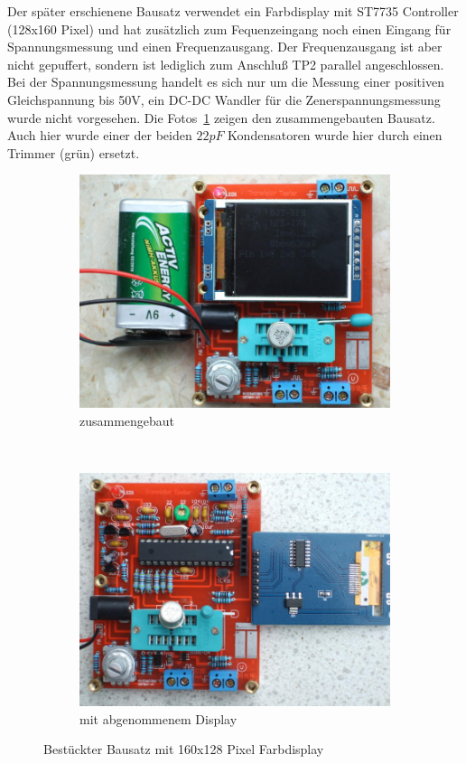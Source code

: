 Der später erschienene Bausatz verwendet ein Farbdisplay mit ST7735 Controller (128x160 Pixel) 
und hat zusätzlich zum Fequenzeingang noch einen Eingang für Spannungsmessung und einen Frequenzausgang.
Der Frequenzausgang ist aber nicht gepuffert, sondern ist lediglich zum Anschluß TP2 parallel 
angeschlossen. Bei der Spannungsmessung handelt es sich nur um die Messung einer positiven Gleichspannung bis 50V,
ein DC-DC Wandler für die Zenerspannungsmessung wurde nicht vorgesehen.
Die Fotos~\ref{fig:Kit_color} zeigen den zusammengebauten Bausatz.
Auch hier wurde einer der beiden \(22 pF\) Kondensatoren 
wurde hier durch einen Trimmer (grün) ersetzt. 

\begin{figure}[H]
  \begin{subfigure}[b]{.5\textwidth}	%
    \centering
    \includegraphics[width=1.\textwidth]{../PNG/Kit_Color_a.jpg}	%
    \caption{zusammengebaut}
  \end{subfigure}
~
  \begin{subfigure}[b]{.5\textwidth}	%
    \centering
    \includegraphics[width=1.\textwidth]{../PNG/Kit_Color_b.jpg}	%
    \caption{mit abgenommenem Display}
  \end{subfigure}
  \caption{Bestückter Bausatz mit 160x128 Pixel Farbdisplay}
\label{fig:Kit_color}
\end{figure}

